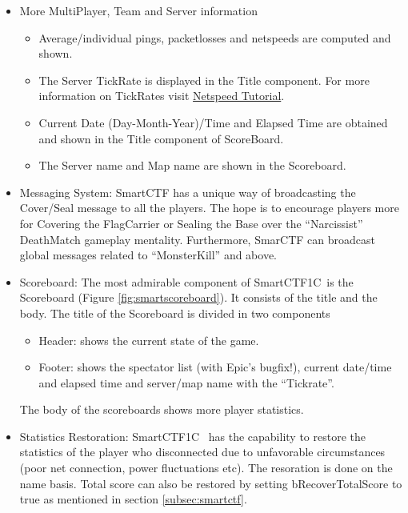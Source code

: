 \documentclass{article}
\newcommand{\SmartVersion}{1C}
\begin{document}
\begin{itemize}
\item More MultiPlayer, Team and Server information
  \begin{itemize}
  \item Average/individual pings, packetlosses and netspeeds are computed and shown.
  \item The Server TickRate is displayed in the Title component.  For more information on TickRates visit \href{http://wiki.unrealadmin.org/Netspeed_Tutorial_(UT)}{\color{Blue}Netspeed Tutorial}.
  \item Current Date (Day-Month-Year)/Time and Elapsed Time are obtained and shown in the Title component of ScoreBoard.
  \item The Server name and Map name are shown in the Scoreboard.
  \end{itemize}
\item Messaging System: SmartCTF has a unique way of broadcasting the Cover/Seal message to all the players.  The hope is to encourage players more for Covering the FlagCarrier or Sealing the Base over the ``Narcissist'' DeathMatch gameplay mentality.  Furthermore, SmarCTF can broadcast global messages related to ``MonsterKill'' and above.
  \item Scoreboard: The most admirable component of SmartCTF\SmartVersion~is the Scoreboard (Figure \ref{fig:smartscoreboard}).  It consists of the title and the body.  The title of the Scoreboard is divided in two components
    \begin{itemize}
    \item Header: shows the current state of the game.
    \item Footer: shows the spectator list (with Epic's bugfix!), current date/time and elapsed time
    and server/map name with the ``Tickrate''.
    \end{itemize}
The body of the scoreboards shows more player statistics.
\item Statistics Restoration: SmartCTF\SmartVersion~ has the capability to restore the statistics of the player who disconnected due to unfavorable circumstances (poor net connection, power fluctuations etc).  The resoration is done on the name basis. Total score can also be restored by setting bRecoverTotalScore to true as mentioned in section \ref{subsec:smartctf}.

\end{itemize}
\end{document}
